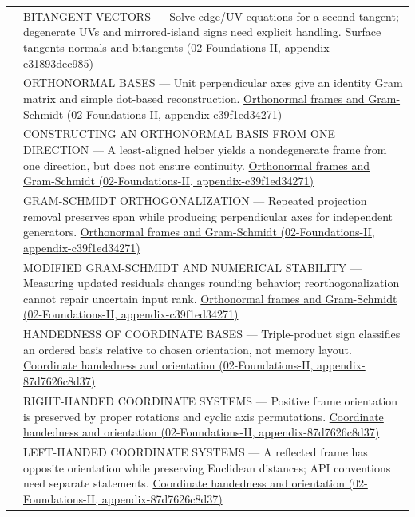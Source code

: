 {\begin{longtable}[]{@{}
  >{\raggedright\arraybackslash}p{}
  >{\raggedright\arraybackslash}p{}@{}}
558 & BITANGENT VECTORS --- Solve edge/UV equations for a second tangent; degenerate UVs and mirrored-island signs need explicit handling. \href{../02-Foundations-II/main.pdf\#nameddest=appendix-e31893dec985}{Surface tangents normals and bitangents (02-Foundations-II, appendix-e31893dec985)} \\
559 & ORTHONORMAL BASES --- Unit perpendicular axes give an identity Gram matrix and simple dot-based reconstruction. \href{../02-Foundations-II/main.pdf\#nameddest=appendix-c39f1ed34271}{Orthonormal frames and Gram-Schmidt (02-Foundations-II, appendix-c39f1ed34271)} \\
560 & CONSTRUCTING AN ORTHONORMAL BASIS FROM ONE DIRECTION --- A least-aligned helper yields a nondegenerate frame from one direction, but does not ensure continuity. \href{../02-Foundations-II/main.pdf\#nameddest=appendix-c39f1ed34271}{Orthonormal frames and Gram-Schmidt (02-Foundations-II, appendix-c39f1ed34271)} \\
561 & GRAM-SCHMIDT ORTHOGONALIZATION --- Repeated projection removal preserves span while producing perpendicular axes for independent generators. \href{../02-Foundations-II/main.pdf\#nameddest=appendix-c39f1ed34271}{Orthonormal frames and Gram-Schmidt (02-Foundations-II, appendix-c39f1ed34271)} \\
562 & MODIFIED GRAM-SCHMIDT AND NUMERICAL STABILITY --- Measuring updated residuals changes rounding behavior; reorthogonalization cannot repair uncertain input rank. \href{../02-Foundations-II/main.pdf\#nameddest=appendix-c39f1ed34271}{Orthonormal frames and Gram-Schmidt (02-Foundations-II, appendix-c39f1ed34271)} \\
563 & HANDEDNESS OF COORDINATE BASES --- Triple-product sign classifies an ordered basis relative to chosen orientation, not memory layout. \href{../02-Foundations-II/main.pdf\#nameddest=appendix-87d7626c8d37}{Coordinate handedness and orientation (02-Foundations-II, appendix-87d7626c8d37)} \\
564 & RIGHT-HANDED COORDINATE SYSTEMS --- Positive frame orientation is preserved by proper rotations and cyclic axis permutations. \href{../02-Foundations-II/main.pdf\#nameddest=appendix-87d7626c8d37}{Coordinate handedness and orientation (02-Foundations-II, appendix-87d7626c8d37)} \\
565 & LEFT-HANDED COORDINATE SYSTEMS --- A reflected frame has opposite orientation while preserving Euclidean distances; API conventions need separate statements. \href{../02-Foundations-II/main.pdf\#nameddest=appendix-87d7626c8d37}{Coordinate handedness and orientation (02-Foundations-II, appendix-87d7626c8d37)} \\

\end{longtable}}
